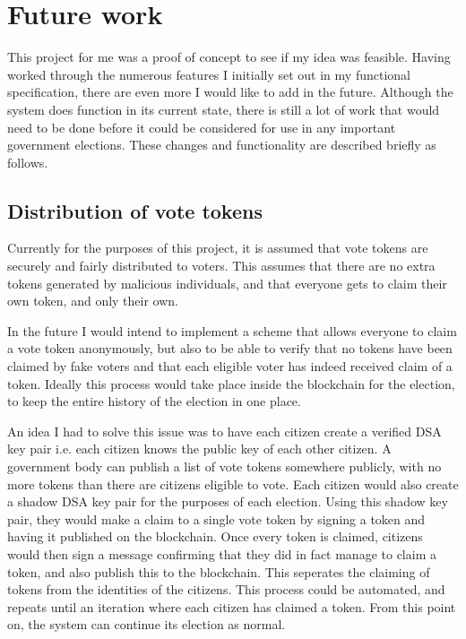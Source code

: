 \documentclass[a4paper,12pt]{article}
\begin{document}
\section{Future work}
This project for me was a proof of concept to see if my idea was feasible. Having worked through the numerous features I initially set out in my functional specification, there are even more I would like to add in the future. Although the system does function in its current state, there is still a lot of work that would need to be done before it could be considered for use in any important government elections. These changes and functionality are described briefly as follows.

\subsection{Distribution of vote tokens}
Currently for the purposes of this project, it is assumed that vote tokens are securely and fairly distributed to voters. This assumes that there are no extra tokens generated by malicious individuals, and that everyone gets to claim their own token, and only their own.

In the future I would intend to implement a scheme that allows everyone to claim a vote token anonymously, but also to be able to verify that no tokens have been claimed by fake voters and that each eligible voter has indeed received claim of a token. Ideally this process would take place inside the blockchain for the election, to keep the entire history of the election in one place.

An idea I had to solve this issue was to have each citizen create a verified DSA key pair i.e. each citizen knows the public key of each other citizen. A government body can publish a list of vote tokens somewhere publicly, with no more tokens than there are citizens eligible to vote. Each citizen would also create a shadow DSA key pair for the purposes of each election. Using this shadow key pair, they would make a claim to a single vote token by signing a token and having it published on the blockchain. Once every token is claimed, citizens would then sign a message confirming that they did in fact manage to claim a token, and also publish this to the blockchain. This seperates the claiming of tokens from the identities of the citizens. This process could be automated, and repeats until an iteration where each citizen has claimed a token. From this point on, the system can continue its election as normal.
\end{document}
